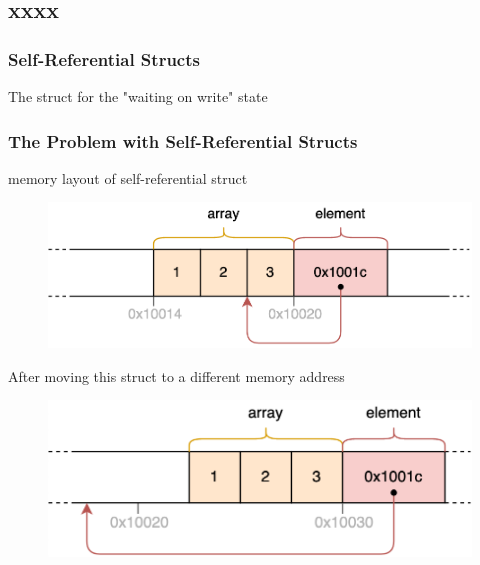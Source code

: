 \subsection{xxxx} %
\begin{frame}[fragile]
    \frametitle{Self-Referential Structs}
% 
% 
% 
% 
% 
The struct for the "waiting on write" state

% 
\end{frame}
\begin{frame}[fragile]
    \frametitle{The Problem with Self-Referential Structs}
% 
% 
{\color{red}memory layout of self-referential struct}
% 
    \begin{figure}
    \includegraphics[width=0.8\linewidth]{figs/self-referential-struct.png}
    \end{figure}
% 
{\color{red}After moving this struct to a different memory address}
% 
    \begin{figure}
    \includegraphics[width=0.8\linewidth]{./figs/self-referential-struct-moved}
    \end{figure}
% 
\end{frame}
